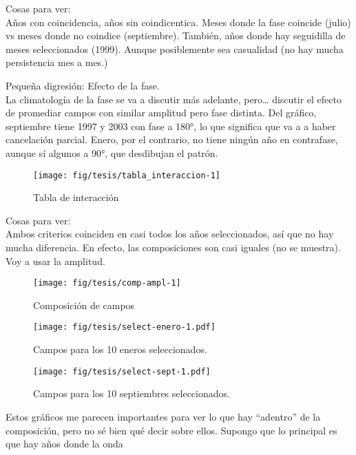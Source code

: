 \documentclass[spanish,a4paper]{book}
\begin{document}
Cosas para ver:\\
Años con coincidencia, años sin coindicentica. Meses donde la fase
coincide (julio) vs meses donde no coindice (septiembre). También, años
donde hay seguidilla de meses seleccionados (1999). Aunque posiblemente
sea casualidad (no hay mucha persistencia mes a mes.)

Pequeña digresión: Efecto de la fase.\\
La climatología de la fase se va a discutir más adelante, pero\ldots{}
discutir el efecto de promediar campos con similar amplitud pero fase
distinta. Del gráfico, septiembre tiene 1997 y 2003 con fase a 180°, lo
que significa que va a a haber cancelación parcial. Enero, por el
contrario, no tiene ningún año en contrafase, aunque sí algunos a 90°,
que desdibujan el patrón.

\begin{figure}

{\centering \texttt{[image: fig/tesis/tabla\_interaccion-1]} 

}

\caption{Tabla de interacción}\label{fig:tabla_interaccion}
\end{figure}

Cosas para ver:\\
Ambos criterios coinciden en casi todos los años seleccionados, así que
no hay mucha diferencia. En efecto, las composiciones son casi iguales
(no se muestra). Voy a usar la amplitud.

\begin{figure}

{\centering \texttt{[image: fig/tesis/comp-ampl-1]} 

}

\caption{Composición de campos}\label{fig:comp-ampl}
\end{figure}

\begin{figure}
\centering
\texttt{[image: fig/tesis/select-enero-1.pdf]}
\caption{Campos para los 10 eneros seleccionados.}
\end{figure}

\begin{figure}
\centering
\texttt{[image: fig/tesis/select-sept-1.pdf]}
\caption{Campos para los 10 septiembres seleccionados.}
\end{figure}

Estos gráficos me parecen importantes para ver lo que hay ``adentro'' de
la composición, pero no sé bien qué decir sobre ellos. Supongo que lo
principal es que hay años donde la onda
\end{document}
